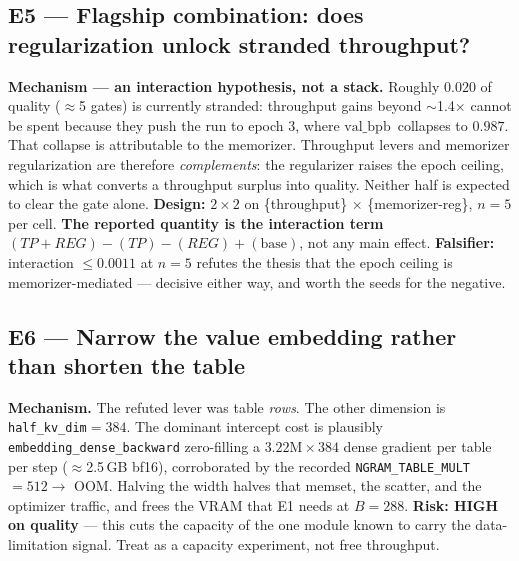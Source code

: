\documentclass{article}
\newcommand{\valbpb}{\mathrm{val\_bpb}}
\begin{document}
\subsection{E5 --- Flagship combination: does regularization unlock stranded throughput?}
\textbf{Mechanism --- an interaction hypothesis, not a stack.} Roughly $0.020$ of quality
($\approx$5 gates) is currently stranded: throughput gains beyond $\sim$1.4$\times$ cannot be
spent because they push the run to epoch 3, where $\valbpb$\ collapses to $0.987$. That
collapse is attributable to the memorizer. Throughput levers and memorizer regularization are
therefore \emph{complements}: the regularizer raises the epoch ceiling, which is what converts
a throughput surplus into quality. Neither half is expected to clear the gate alone.
\textbf{Design:} $2\times2$ on \{throughput\} $\times$ \{memorizer-reg\}, $n{=}5$ per cell.
\textbf{The reported quantity is the interaction term}
$(TP{+}REG) - (TP) - (REG) + (\mathrm{base})$, not any main effect.
\textbf{Falsifier:} interaction $\le 0.0011$ at $n{=}5$ refutes the thesis that the epoch
ceiling is memorizer-mediated --- decisive either way, and worth the seeds for the negative.

\subsection{E6 --- Narrow the value embedding rather than shorten the table}
\textbf{Mechanism.} The refuted lever was table \emph{rows}. The other dimension is
\texttt{half\_kv\_dim}$=384$. The dominant intercept cost is plausibly
\texttt{embedding\_dense\_backward} zero-filling a $3.22\mathrm{M}\times384$ dense gradient
per table per step ($\approx$2.5\,GB bf16), corroborated by the recorded
\texttt{NGRAM\_TABLE\_MULT}$=512 \to$ OOM. Halving the width halves that memset, the scatter,
and the optimizer traffic, and frees the VRAM that E1 needs at $B{=}288$.
\textbf{Risk: HIGH on quality} --- this cuts the capacity of the one module known to carry
the data-limitation signal. Treat as a capacity experiment, not free throughput.
\end{document}
